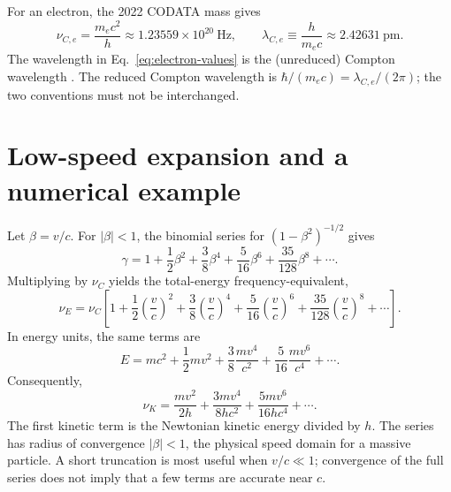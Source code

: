 \documentclass[12pt]{article}
\begin{document}
For an electron, the 2022 CODATA mass gives \cite{CODATA}
\begin{equation}
  \nu_{C,e}=\frac{m_ec^2}{h}\approx1.23559\times10^{20}\ \mathrm{Hz},
  \qquad
  \lambda_{C,e}\equiv\frac{h}{m_ec}\approx2.42631\ \mathrm{pm}.
  \label{eq:electron-values}
\end{equation}
The wavelength in Eq.~\eqref{eq:electron-values} is the (unreduced) Compton wavelength \cite{Compton}. The reduced Compton wavelength is $\hbar/(m_ec)=\lambda_{C,e}/(2\pi)$; the two conventions must not be interchanged.

\section{Low-speed expansion and a numerical example}

Let $\beta=v/c$. For $|\beta|<1$, the binomial series for $(1-\beta^2)^{-1/2}$ gives \cite{DLMF}
\begin{equation}
  \gamma
  =1+\frac{1}{2}\beta^2+\frac{3}{8}\beta^4
    +\frac{5}{16}\beta^6+\frac{35}{128}\beta^8+\cdots.
  \label{eq:gamma-series}
\end{equation}
Multiplying by $\nu_C$ yields the total-energy frequency-equivalent,
\begin{equation}
  \nu_E=\nu_C\left[
    1+\frac{1}{2}\left(\frac{v}{c}\right)^2
    +\frac{3}{8}\left(\frac{v}{c}\right)^4
    +\frac{5}{16}\left(\frac{v}{c}\right)^6
    +\frac{35}{128}\left(\frac{v}{c}\right)^8+\cdots\right].
  \label{eq:frequency-series}
\end{equation}
In energy units, the same terms are
\begin{equation}
  E=mc^2+\frac{1}{2}mv^2+\frac{3}{8}\frac{mv^4}{c^2}
    +\frac{5}{16}\frac{mv^6}{c^4}+\cdots.
  \label{eq:energy-speed-series}
\end{equation}
Consequently,
\begin{equation}
  \nu_K=\frac{mv^2}{2h}+\frac{3mv^4}{8hc^2}
    +\frac{5mv^6}{16hc^4}+\cdots.
  \label{eq:kinetic-series}
\end{equation}
The first kinetic term is the Newtonian kinetic energy divided by $h$. The series has radius of convergence $|\beta|<1$, the physical speed domain for a massive particle. A short truncation is most useful when $v/c\ll1$; convergence of the full series does not imply that a few terms are accurate near $c$.
\end{document}
